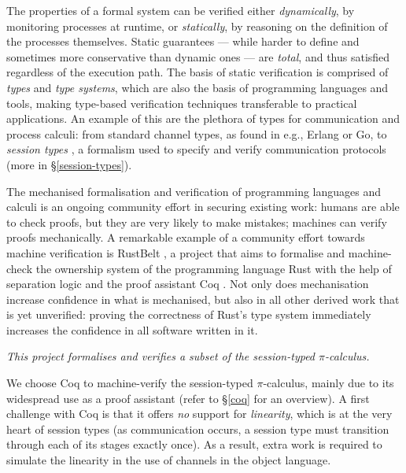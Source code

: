 \documentclass{mproj}
\newcommand{\picalc}{$\pi$-calculus}
\begin{document}
The properties of a formal system can be verified either \emph{dynamically}, by monitoring processes at runtime, or \emph{statically}, by reasoning on the definition of the processes themselves.  Static guarantees --- while harder to define and sometimes more conservative than dynamic ones --- are \emph{total}, and thus satisfied regardless of the execution path. The basis of static verification is comprised of \emph{types} and \emph{type systems}, which are also the basis of programming languages and tools, making type-based verification techniques transferable to practical applications. An example of this are the plethora of types for communication and process calculi: from standard channel types, as found in e.g., Erlang or Go, to \emph{session types} \cite{Honda1993, Takeuchi1994, Honda1998}, a formalism used to specify and verify communication protocols (more in \S \ref{session-types}).

The mechanised formalisation and verification of programming languages and calculi is an ongoing community effort in securing existing work: humans are able to check proofs, but they are very likely to make mistakes; machines can verify proofs mechanically. A remarkable example of a community effort towards machine verification is RustBelt \cite{Dreyer2018}, a project that aims to formalise and machine-check the ownership system of the programming language Rust with the help of separation logic \cite{Reynolds2002} and the proof assistant Coq \cite{Coquand1990, CoqDeveloperCommunity} . Not only does mechanisation increase confidence in what is mechanised, but also in all other derived work that is yet unverified: proving the correctness of Rust's type system immediately increases the confidence in all software written in it.

\begin{center}
    \emph{This project formalises and verifies a subset of the session-typed \picalc{}.}
\end{center}

We choose Coq \cite{Coquand1990, CoqDeveloperCommunity} to machine-verify the session-typed \picalc{}, mainly due to its widespread use as a proof assistant (refer to \S \ref{coq} for an overview). A first challenge with Coq is that it offers \emph{no} support for \emph{linearity}, which is at the very heart of session types (as communication occurs, a session type must transition through each of its stages exactly once). As a result, extra work is required to simulate the linearity in the use of channels in the object language.
\end{document}

